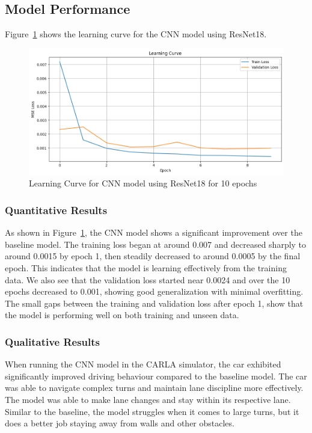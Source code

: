 \documentclass{article} %
\begin{document}
\subsection{Model Performance}

Figure~\ref{fig:learningCurveforCNN} shows the learning curve for the CNN model using ResNet18. 


\begin{figure}[H] %
    \centering
    \includegraphics[width=1.0\textwidth]{learningCurveforCNN.png} %
    \caption{Learning Curve for CNN model using ResNet18 for 10 epochs}
    \label{fig:learningCurveforCNN}
\end{figure}

\subsubsection{Quantitative Results}

As shown in Figure~\ref{fig:learningCurveforCNN}, the CNN model shows a significant improvement over the baseline model. 
The training loss began at around 0.007 and decreased sharply to around 0.0015 by epoch 1, then steadily decreased to around 0.0005 by the final 
epoch. This indicates that the model is learning effectively from the training data. 
We also see that the validation loss started near 0.0024 and over the 10 epochs decreased to 0.001, showing good generalization with minimal overfitting.
The small gaps between the training and validation loss after epoch 1, show that the model is performing well on both training and unseen data.


\subsubsection{Qualitative Results}

When running the CNN model in the CARLA simulator, the car exhibited significantly improved driving behaviour compared to the baseline model. 
The car was able to navigate complex turns and maintain lane discipline more effectively. The model was able to make lane changes and stay within its respective lane.
Similar to the baseline, the model struggles when it comes to large turns, but it does a better job staying away from walls and other obstacles.
\end{document}
